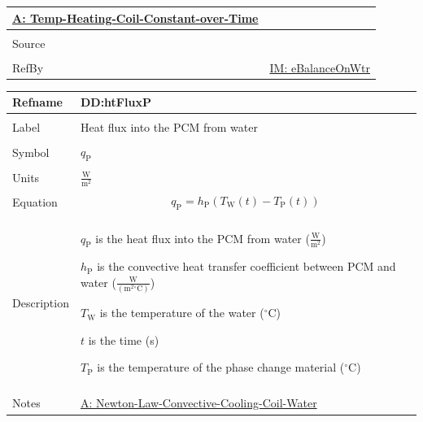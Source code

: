 \documentclass[12pt]{article}
\begin{document}
\begin{minipage}{\textwidth}
\begin{tabular}{>{\raggedright}p{}>{\raggedright\arraybackslash}p{}}
        \hyperref[assumpTHCCoT]{A: Temp-Heating-Coil-Constant-over-Time}
        
\\ \midrule \\
Source & \cite{koothoor2013}
         
\\ \midrule \\
RefBy & \hyperref[IM:eBalanceOnWtr]{IM: eBalanceOnWtr}
        
\\ \bottomrule
\end{tabular}
\end{minipage}

\vspace{\baselineskip}
\noindent
\begin{minipage}{\textwidth}
\begin{tabular}{>{\raggedright}p{}>{\raggedright\arraybackslash}p{}}
\toprule \textbf{Refname} & \textbf{DD:htFluxP}
\label{DD:htFluxP}
\\ \midrule \\
Label & Heat flux into the PCM from water
        
\\ \midrule \\
Symbol & ${q_{\text{P}}}$
         
\\ \midrule \\
Units & $\frac{\text{W}}{\text{m}^{2}}$
        
\\ \midrule \\
Equation & \begin{displaymath}
           {q_{\text{P}}}={h_{\text{P}}} \left({T_{\text{W}}}\left(t\right)-{T_{\text{P}}}\left(t\right)\right)
           \end{displaymath}
\\ \midrule \\
Description & \begin{symbDescription}
              \item{${q_{\text{P}}}$ is the heat flux into the PCM from water ($\frac{\text{W}}{\text{m}^{2}}$)}
              \item{${h_{\text{P}}}$ is the convective heat transfer coefficient between PCM and water ($\frac{\text{W}}{(\text{m}^{2}{}^{\circ}\text{C})}$)}
              \item{${T_{\text{W}}}$ is the temperature of the water (${}^{\circ}$C)}
              \item{$t$ is the time (s)}
              \item{${T_{\text{P}}}$ is the temperature of the phase change material (${}^{\circ}$C)}
              \end{symbDescription}
\\ \midrule \\
Notes & \hyperref[assumpLCCCW]{A: Newton-Law-Convective-Cooling-Coil-Water}
        

\end{tabular}
\end{minipage}
\end{document}
